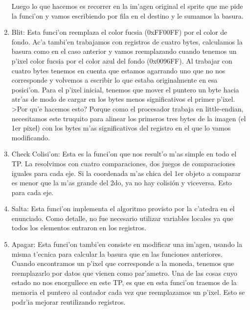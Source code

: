 \begin{enumerate}
Luego lo que hacemos es recorrer en la im'agen original el sprite que me pide la funci'on y vamos escribiendo por fila en el destino y le sumamos la basura.
\item Blit:
Esta funci'on reemplaza el color fucsia (0xFF00FF) por el color de fondo.  Ac'a tambi'en trabajamos con registros de cuatro bytes, calculamos la basura como en el caso anterior y vamos reemplazando cuando tenemos un p'ixel color fucsia por el color azul del fondo (0x0096FF).  Al trabajar con cuatro bytes tenemos en cuenta que estamos agarrando uno que no nos corresponde y volvemos a escribir lo que estaba originalmente en esa posici'on.  Para el p'ixel inicial, tenemos que mover el puntero un byte hacia atr'as de modo de cargar en los bytes menos significativos el primer p'ixel.  >Por qu'e hacemos esto?  Porque como el procesador trabaja en little-endian, necesitamos este truquito para alinear los primeros tres bytes de la imagen (el 1er pixel) con los bytes m'as significativos del registro en el que lo vamos modificando.
\item Check Colisi'on:
Esta es la funci'on que nos result'o m'as simple en todo el TP.  La resolvimos con cuatro comparaciones, dos juegos de comparaciones iguales para cada eje.  Si la coordenada m'as chica del 1er objeto a comparar es menor que la m'as grande del 2do, ya no hay colisión y viceversa.  Esto para cada eje.
\item Salta:
Esta funci'on implementa el algoritmo provisto por la c'atedra en el enunciado.  Como detalle, no fue necesario utilizar variables locales ya que todos los elementos entraron en los registros.
\item Apagar:
Esta funci'on tambi'en consiste en modificar una im'agen, usando la misma t'ecnica para calcular la basura que en las funciones anteriores.  Cuando encontramos un p'ixel que corresponde a la moneda, tenemos que reemplazarlo por datos que vienen como par'ametro.  Una de las cosas cuyo estado no nos enorgullece en este TP, es que en esta funci'on traemos de la memoria el puntero al contador cada vez que reemplazamos un p'ixel.  Esto se podr'ia mejorar reutilizando registros.
\end{enumerate}



